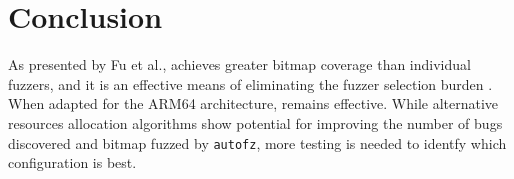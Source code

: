 \section{Conclusion}
As presented by Fu et al.,  achieves greater bitmap coverage than individual 
fuzzers, and it is an effective means of eliminating the fuzzer selection burden \cite{fu_autofz_2023}. 
When adapted for the ARM64 architecture,  remains effective. 
While alternative resources allocation algorithms show potential for improving the number of bugs discovered
and bitmap fuzzed by \texttt{autofz}, more testing is needed to identfy which configuration is best.
